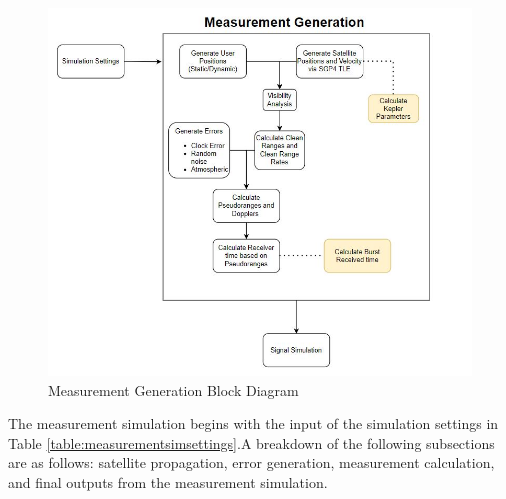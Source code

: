 \documentclass[12pt]{report}
\begin{document}
\begin{figure}[h]
    \centering
    \includegraphics[width=6in]{MeasurementGenBlockDiagram}
    \caption{Measurement Generation Block Diagram}
    \label{fig:MeasBlock}
\end{figure}

The measurement simulation begins with the input of the simulation settings in Table \ref{table:measurementsimsettings}.A breakdown of the following subsections are as follows: satellite propagation, error generation, measurement calculation, and final outputs from the measurement simulation. 
\end{document}
